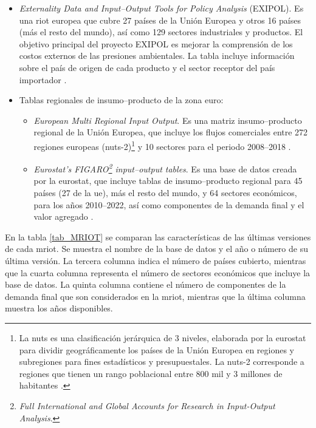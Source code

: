 \begin{itemize}
 \item \textit{Externality Data and Input--Output Tools for Policy Analysis} (EXIPOL). Es una \gls{riot} europea que cubre 27 países de la Unión Europea y otros 16 países (más el resto del mundo), así como 129 sectores industriales y productos. El objetivo principal del proyecto EXIPOL es mejorar la comprensión de los costos externos de las presiones ambientales. La tabla incluye información sobre el país de origen de cada producto y el sector receptor del país importador \parencite{Tukker2009, Wiedmann2011, Tukker2013}.
 
 \item Tablas regionales de insumo--producto de la zona euro:
 \begin{itemize}
  \item \textit{European Multi Regional Input Output}. Es una matriz insumo--producto regional de la Unión Europea, que incluye los flujos comerciales entre 272 regiones europeas (\acrshort{nuts}-2)\footnote{La \gls{nuts} es una clasificación jerárquica de 3 niveles, elaborada por la \gls{eurostat} para dividir geográficamente los países de la Unión Europea en regiones y subregiones para fines estadísticos y presupuestales. La \gls{nuts}-2 corresponde a regiones que tienen un rango poblacional entre 800 mil y 3 millones de habitantes \parencite{NUTS}.} y 10 sectores para el periodo 2008--2018 \parencite{Huang2023}.
  \item \textit{Eurostat's FIGARO\footnote{\textit{Full International and Global Accounts for Research in Input-Output Analysis}.} input--output tables}. Es una base de datos creada por la \gls{eurostat}, que incluye tablas de insumo--producto regional para 45 países (27 de la \gls{ue}), más el resto del mundo, y 64 sectores económicos, para los años 2010--2022, así como componentes de la demanda final y el valor agregado \parencite{FIGARO}.
  
 \end{itemize}
\end{itemize}

En la tabla \ref{tab_MRIOT} se comparan las características de las últimas versiones de cada \gls{mriot}. Se muestra el nombre de la base de datos y el año o número de su última versión. La tercera columna indica el número de países cubierto, mientras que la cuarta columna representa el número de sectores económicos que incluye la base de datos. La quinta columna contiene el número de componentes de la demanda final que son considerados en la \gls{mriot}, mientras que la última columna muestra los años disponibles.


